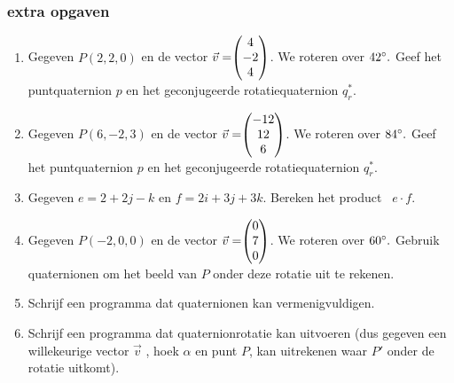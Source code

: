 \subsubsection{extra opgaven}
\begin{enumerate}
	\item Gegeven $ P (2,2,0) $ en de vector $\vec{v} = \vecdrie{4}{-2}{4} $. 
	We roteren over $ 42\degree. $ Geef het puntquaternion $p$ en het geconjugeerde rotatiequaternion  $  q_r^* $. \\
	
	\item Gegeven $ P (6,-2,3) $ en de vector $\vec{v} = \vecdrie{-12}{12}{6} $. 
	We roteren over $ 84\degree. $ Geef het puntquaternion $p$ en het geconjugeerde rotatiequaternion  $  q_r^* $. \\
	
	\item Gegeven $ e = 2 +2j-k $ en   $ f = 2i+3j+3k $. 
	Bereken het product \ $  e\cdot f $.\\
	
	\item  Gegeven $ P (-2, 0, 0) $ en de vector $\vec{v} = \vecdrie{0}{7}{0} $. 
	We roteren over $ 60\degree. $ Gebruik quaternionen om het beeld van $P$ onder deze rotatie uit te rekenen.   \\
	
	\item Schrijf een programma dat quaternionen kan vermenigvuldigen.  \\ 
	
	\item Schrijf een programma dat quaternionrotatie kan uitvoeren (dus gegeven een willekeurige vector $\vec{v} $ , hoek $ \alpha $ en punt $P$, kan uitrekenen waar $P'$ onder de rotatie uitkomt).      \\	
\end{enumerate}
